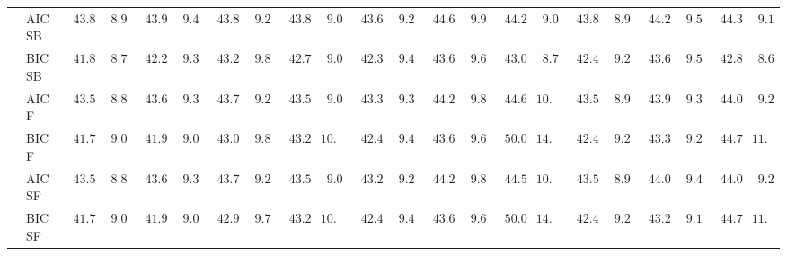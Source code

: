 \begin{tabular}{p{0.2cm}p{1cm}|p{0.6cm}p{0.6cm}|p{0.6cm}p{0.6cm}p{0.6cm}p{0.6cm}p{0.6cm}p{0.6cm}|p{0.6cm}p{0.6cm}p{0.6cm}p{0.6cm}p{0.6cm}p{0.6cm}|p{0.6cm}p{0.6cm}p{0.6cm}p{0.6cm}p{0.6cm}p{0.6cm}}
 & AIC SB  & $\phantom{0}43.85$ & $\phantom{0}8.96$ & $\phantom{0}43.93$ & $\phantom{0}9.44$ & $\phantom{0}43.83$ & $\phantom{0}9.23$ & $\phantom{0}43.84$ & $\phantom{0}9.07$ & $\phantom{0}43.65$ & $\phantom{0}9.20$ & $\phantom{0}44.63$ & $\phantom{0}9.96$ & $\phantom{0}44.29$ & $\phantom{0}9.00$ & $\phantom{0}43.87$ & $\phantom{0}8.99$ & $\phantom{0}44.27$ & $\phantom{0}9.50$ & $\phantom{0}44.39$ & $\phantom{0}9.15$ \\
 & BIC SB  & $\phantom{0}41.89$ & $\phantom{0}8.76$ & $\phantom{0}42.25$ & $\phantom{0}9.30$ & $\phantom{0}43.26$ & $\phantom{0}9.81$ & $\phantom{0}42.74$ & $\phantom{0}9.03$ & $\phantom{0}42.35$ & $\phantom{0}9.46$ & $\phantom{0}43.67$ & $\phantom{0}9.69$ & $\phantom{0}43.05$ & $\phantom{0}8.76$ & $\phantom{0}42.49$ & $\phantom{0}9.20$ & $\phantom{0}43.66$ & $\phantom{0}9.56$ & $\phantom{0}42.80$ & $\phantom{0}8.67$ \\
 & AIC F  & $\phantom{0}43.53$ & $\phantom{0}8.89$ & $\phantom{0}43.69$ & $\phantom{0}9.35$ & $\phantom{0}43.76$ & $\phantom{0}9.24$ & $\phantom{0}43.58$ & $\phantom{0}9.04$ & $\phantom{0}43.31$ & $\phantom{0}9.37$ & $\phantom{0}44.28$ & $\phantom{0}9.82$ & $\phantom{0}44.62$ & $10.52$ & $\phantom{0}43.53$ & $\phantom{0}8.95$ & $\phantom{0}43.99$ & $\phantom{0}9.33$ & $\phantom{0}44.00$ & $\phantom{0}9.25$ \\
 & BIC F  & $\phantom{0}41.72$ & $\phantom{0}9.09$ & $\phantom{0}41.98$ & $\phantom{0}9.00$ & $\phantom{0}43.00$ & $\phantom{0}9.87$ & $\phantom{0}43.25$ & $10.50$ & $\phantom{0}42.43$ & $\phantom{0}9.41$ & $\phantom{0}43.60$ & $\phantom{0}9.63$ & $\phantom{0}50.08$ & $14.76$ & $\phantom{0}42.46$ & $\phantom{0}9.20$ & $\phantom{0}43.30$ & $\phantom{0}9.25$ & $\phantom{0}44.70$ & $11.92$ \\
 & AIC SF  & $\phantom{0}43.53$ & $\phantom{0}8.89$ & $\phantom{0}43.69$ & $\phantom{0}9.35$ & $\phantom{0}43.76$ & $\phantom{0}9.24$ & $\phantom{0}43.58$ & $\phantom{0}9.04$ & $\phantom{0}43.26$ & $\phantom{0}9.24$ & $\phantom{0}44.29$ & $\phantom{0}9.83$ & $\phantom{0}44.59$ & $10.71$ & $\phantom{0}43.53$ & $\phantom{0}8.95$ & $\phantom{0}44.09$ & $\phantom{0}9.42$ & $\phantom{0}44.03$ & $\phantom{0}9.23$ \\
 & BIC SF  & $\phantom{0}41.72$ & $\phantom{0}9.09$ & $\phantom{0}41.98$ & $\phantom{0}9.00$ & $\phantom{0}42.93$ & $\phantom{0}9.78$ & $\phantom{0}43.25$ & $10.50$ & $\phantom{0}42.43$ & $\phantom{0}9.41$ & $\phantom{0}43.60$ & $\phantom{0}9.63$ & $\phantom{0}50.08$ & $14.76$ & $\phantom{0}42.46$ & $\phantom{0}9.20$ & $\phantom{0}43.25$ & $\phantom{0}9.18$ & $\phantom{0}44.70$ & $11.92$ \\

\end{tabular}
